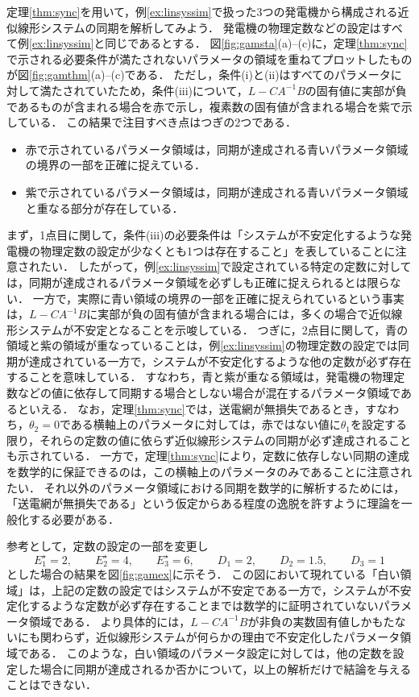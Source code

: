 \documentclass[a4j,10pt,oneside,openany,dvipdfmx]{jsbook}
\begin{document}
\begin{example}[正実性や特異摂動近似に基づく近似線形システムの同期解析]\label{ex:linthm}
定理\ref{thm:sync}を用いて，例\ref{ex:linsyssim}で扱った3つの発電機から構成される近似線形システムの同期を解析してみよう．
発電機の物理定数などの設定はすべて例\ref{ex:linsyssim}と同じであるとする．
図\ref{fig:gamsta}(a)--(c)に，定理\ref{thm:sync}で示される必要条件が満たされないパラメータの領域を重ねてプロットしたものが図\ref{fig:gamthm}(a)--(c)である．
ただし，条件(i)と(ii)はすべてのパラメータに対して満たされていたため，条件(iii)について，$L-CA^{-1}B$の固有値に実部が負であるものが含まれる場合を赤で示し，複素数の固有値が含まれる場合を紫で示している．
この結果で注目すべき点はつぎの2つである．
\begin{itemize}
\item 赤で示されているパラメータ領域は，同期が達成される青いパラメータ領域の境界の一部を正確に捉えている．
\item 紫で示されているパラメータ領域は，同期が達成される青いパラメータ領域と重なる部分が存在している．
\end{itemize}
まず，1点目に関して，条件(iii)の必要条件は「システムが不安定化するような発電機の物理定数の設定が少なくとも1つは存在すること」を表していることに注意されたい．
したがって，例\ref{ex:linsyssim}で設定されている特定の定数に対しては，同期が達成されるパラメータ領域を必ずしも正確に捉えられるとは限らない．
一方で，実際に青い領域の境界の一部を正確に捉えられているという事実は，$L-CA^{-1}B$に実部が負の固有値が含まれる場合には，多くの場合で近似線形システムが不安定となることを示唆している．
つぎに，2点目に関して，青の領域と紫の領域が重なっていることは，例\ref{ex:linsyssim}の物理定数の設定では同期が達成されている一方で，システムが不安定化するような他の定数が必ず存在することを意味している．
すなわち，青と紫が重なる領域は，発電機の物理定数などの値に依存して同期する場合としない場合が混在するパラメータ領域であるといえる．
なお，定理\ref{thm:sync}では，送電網が無損失であるとき，すなわち，$\theta_2=0$である横軸上のパラメータに対しては，赤ではない値に$\theta_1$を設定する限り，それらの定数の値に依らず近似線形システムの同期が必ず達成されることも示されている．
一方で，定理\ref{thm:sync}により，定数に依存しない同期の達成を数学的に保証できるのは，この横軸上のパラメータのみであることに注意されたい．
それ以外のパラメータ領域における同期を数学的に解析するためには，「送電網が無損失である」という仮定からある程度の逸脱を許すように理論を一般化する必要がある．

参考として，定数の設定の一部を変更し
\[
E_1^{\star}=2
,\qquad
E_2^{\star}=4
,\qquad
E_3^{\star}=6
,\qquad
D_1 = 2
,\qquad
D_2 = 1.5
,\qquad
D_3 = 1
\]
とした場合の結果を図\ref{fig:gamex}に示そう．
この図において現れている「白い領域」は，上記の定数の設定ではシステムが不安定である一方で，システムが不安定化するような定数が必ず存在することまでは数学的に証明されていないパラメータ領域である．
より具体的には，$L-CA^{-1}B$が非負の実数固有値しかもたないにも関わらず，近似線形システムが何らかの理由で不安定化したパラメータ領域である．
このような，白い領域のパラメータ設定に対しては，他の定数を設定した場合に同期が達成されるか否かについて，以上の解析だけで結論を与えることはできない．
\end{example}
\end{document}
